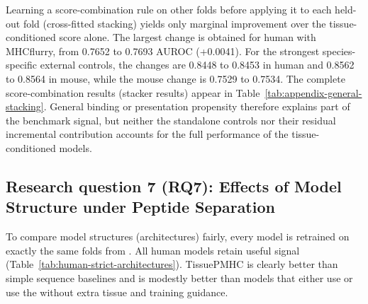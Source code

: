 Learning a score-combination rule on other folds before applying it to each held-out fold (cross-fitted stacking) yields only marginal improvement over the tissue-conditioned score alone. The largest change is obtained for human \plainPeptideOOF{} with MHCflurry, from 0.7652 to 0.7693 AUROC (+0.0041). For the strongest species-specific external controls, the \plainFixedTest{} changes are 0.8448 to 0.8453 in human and 0.8562 to 0.8564 in mouse, while the mouse \plainPeptideOOF{} change is 0.7529 to 0.7534. The complete score-combination results (stacker results) appear in Table~\ref{tab:appendix-general-stacking}. General binding or presentation propensity therefore explains part of the benchmark signal, but neither the standalone controls nor their residual incremental contribution accounts for the full performance of the tissue-conditioned models.

\subsection{Research question 7 (RQ7): Effects of Model Structure under Peptide Separation}

To compare model structures (architectures) fairly, every model is retrained on exactly the same folds from \plainPeptideOOF{}. All human models retain useful signal (Table~\ref{tab:human-strict-architectures}). TissuePMHC is clearly better than simple sequence baselines and is modestly better than models that either use \plainSharedHeads{} or use the \plainPlainDual{} without extra tissue and \plainHLA{} training guidance.

